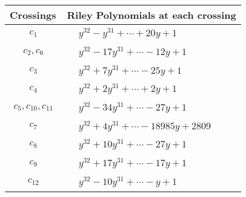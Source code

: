 \documentclass[1p]{elsarticle_modified}
\theoremstyle{definition}
\begin{document}
\begin{tabular}{m{50pt}|m{274pt}}
Crossings & \hspace{64pt}Riley Polynomials at each crossing \\
\hline $$\begin{aligned}c_{1}\end{aligned}$$&$\begin{aligned}
&y^{32}- y^{31}+\cdots+20 y+1
\end{aligned}$\\
\hline $$\begin{aligned}c_{2},c_{6}\end{aligned}$$&$\begin{aligned}
&y^{32}-17 y^{31}+\cdots-12 y+1
\end{aligned}$\\
\hline $$\begin{aligned}c_{3}\end{aligned}$$&$\begin{aligned}
&y^{32}+7 y^{31}+\cdots-25 y+1
\end{aligned}$\\
\hline $$\begin{aligned}c_{4}\end{aligned}$$&$\begin{aligned}
&y^{32}+2 y^{31}+\cdots+2 y+1
\end{aligned}$\\
\hline $$\begin{aligned}c_{5},c_{10},c_{11}\end{aligned}$$&$\begin{aligned}
&y^{32}-34 y^{31}+\cdots-27 y+1
\end{aligned}$\\
\hline $$\begin{aligned}c_{7}\end{aligned}$$&$\begin{aligned}
&y^{32}+4 y^{31}+\cdots-18985 y+2809
\end{aligned}$\\
\hline $$\begin{aligned}c_{8}\end{aligned}$$&$\begin{aligned}
&y^{32}+10 y^{31}+\cdots-27 y+1
\end{aligned}$\\
\hline $$\begin{aligned}c_{9}\end{aligned}$$&$\begin{aligned}
&y^{32}+17 y^{31}+\cdots-17 y+1
\end{aligned}$\\
\hline $$\begin{aligned}c_{12}\end{aligned}$$&$\begin{aligned}
&y^{32}-10 y^{31}+\cdots- y+1
\end{aligned}$\\
\hline
\end{tabular}\\~\\
\end{document}
